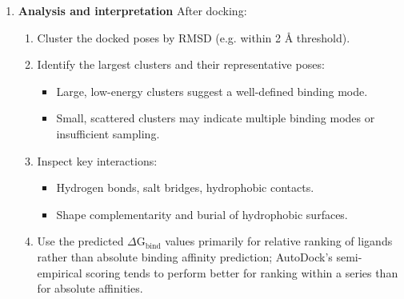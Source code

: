\documentclass[12pt]{article}
\begin{document}
\begin{enumerate}
\begin{enumerate}
\begin{enumerate}
  \item Run \verb|autodock| with the prepared DPF:
  \begin{itemize}
    \item \verb|autodock| reads the receptor and ligand PDBQT files and the AutoGrid maps.
    \item It initialises random ligand poses and starts LGA runs according to the specified parameters.
  \end{itemize}
  \item \verb|autodock| outputs a docking log file (DLG) containing:
  \begin{itemize}
    \item For each run: the best pose found, its estimated binding free energy $\Delta\textrm{G}_{\text{bind}}$, and the corresponding estimated inhibition constant $\textrm{K}_\textrm{i}$.
    \item Detailed information about the genetic algorithm progress (if enabled).
  \end{itemize}
\end{enumerate}
\end{enumerate}
  \item \textbf{Analysis and interpretation}
  After docking:
\begin{enumerate}
  \item Cluster the docked poses by RMSD (e.g. within 2 \r{A} threshold).
  \item Identify the largest clusters and their representative poses:
  \begin{itemize}
    \item Large, low-energy clusters suggest a well-defined binding mode.
    \item Small, scattered clusters may indicate multiple binding modes or insufficient sampling.
  \end{itemize}
  \item Inspect key interactions:
  \begin{itemize}
    \item Hydrogen bonds, salt bridges, hydrophobic contacts.
    \item Shape complementarity and burial of hydrophobic surfaces.
  \end{itemize}
  \item Use the predicted $\Delta \textrm{G}_{\textrm{bind}}$ values primarily for relative ranking of ligands rather than absolute binding affinity prediction; AutoDock's semi-empirical scoring tends to perform better for ranking within a series than for absolute affinities\cite{CH7_Huey2007,CH7_Morris2009}.
\end{enumerate}
\end{enumerate}
\end{document}
